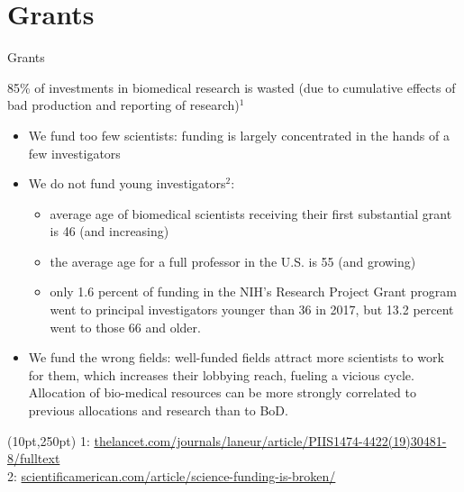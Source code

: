 \documentclass{beamer}
\begin{document}

\section{Grants}
\begin{frame}{Grants}

	85\% of investments in biomedical research is wasted (due to cumulative effects of bad production and reporting of research)$^{1}$

	\begin{itemize}
		\item<2-> We fund too few scientists: funding is largely concentrated in the hands of a few investigators
		\item<3-> We do not fund young investigators$^{2}$: 
		\begin{itemize}
			\item<4-> average age of biomedical scientists receiving their first substantial grant is 46 (and increasing) 
			\item<5-> the average age for a full professor in the U.S. is 55 (and growing)
			\item<6-> only 1.6 percent of funding in the NIH's Research Project Grant program went to principal investigators younger than 36 in 2017, but 13.2 percent went to those 66 and older.
		\end{itemize}
		\item<7-> We fund the wrong fields: well-funded fields attract more scientists to work for them, which increases their lobbying reach, fueling a vicious cycle. Allocation of bio-medical resources can be more strongly correlated to previous allocations and research than to BoD.
	\end{itemize}
	

	\begin{textblock*}{300pt}(10pt,250pt)
		\tiny{1: \url{thelancet.com/journals/laneur/article/PIIS1474-4422(19)30481-8/fulltext}\\ 2: \url{scientificamerican.com/article/science-funding-is-broken/}}

	\end{textblock*}
	
\end{frame}
\end{document}

